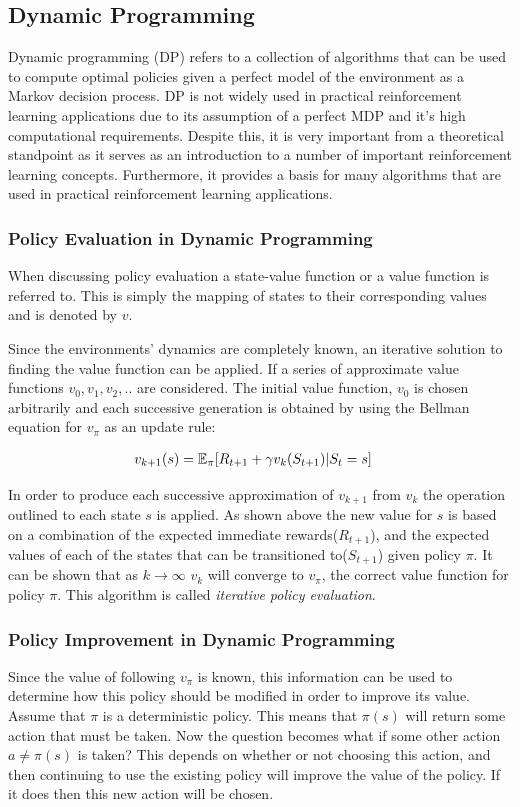 \subsection{Dynamic Programming}\label{subsec:dp}
Dynamic programming (DP) refers to a collection of algorithms that can be used to compute optimal policies given a
perfect model of the environment as a Markov decision process\citep{sutton1998reinforcement}.
DP is not widely used in practical reinforcement learning applications due to its assumption
of a perfect MDP and it's high computational requirements.
Despite this, it is very important from a theoretical standpoint as it serves as an introduction to a number
of important reinforcement learning concepts.
Furthermore, it provides a basis for many algorithms that are used in practical reinforcement learning applications.

\subsubsection{Policy Evaluation in Dynamic Programming}
When discussing policy evaluation a state-value function or a value function is referred to.
This is simply the mapping of states to their corresponding values and is denoted by $v$.

Since the environments' dynamics are completely known, an iterative solution to finding
the value function can be applied.
If a series of approximate value functions $v_0, v_1, v_2,..$ are considered.
The initial value function, $v_0$ is chosen arbitrarily and each successive generation is obtained by
using the Bellman equation for $v_\pi$ as an update rule\citep{sutton1998reinforcement}:

\begin{align}
    v_{k+1}(s) &= \operatorname{\mathbb{E}}_{\pi}\lbrack R_{t+1} + \gamma v_k(S_{t+1}) | S_t = s \rbrack
\end{align}

In order to produce each successive approximation of $v_{k+1}$ from $v_k$ the operation outlined to each
state $s$ is applied.
As shown above the new value for $s$ is based on a combination of the expected immediate rewards($R_{t+1}$),
and the expected values of each of the states that can be transitioned to($S_{t+1}$) given policy $\pi$.
It can be shown that as $k\rightarrow\infty$ $v_k$ will converge to $v_\pi$, the correct value function for policy
$\pi$.
This algorithm is called \textit{iterative policy evaluation}\citep{sutton1998reinforcement}.

\subsubsection{Policy Improvement in Dynamic Programming}
Since the value of following $v_\pi$ is known, this information can be used to determine how
this policy should be modified in order to improve its value.
Assume that $\pi$ is a deterministic policy.
This means that $\pi(s)$ will return some action that must be taken.
Now the question becomes what if some other action $a \neq \pi(s)$ is taken?
This depends on whether or not choosing this action, and then continuing to use the existing policy will
improve the value of the policy.
If it does then this new action will be chosen.

